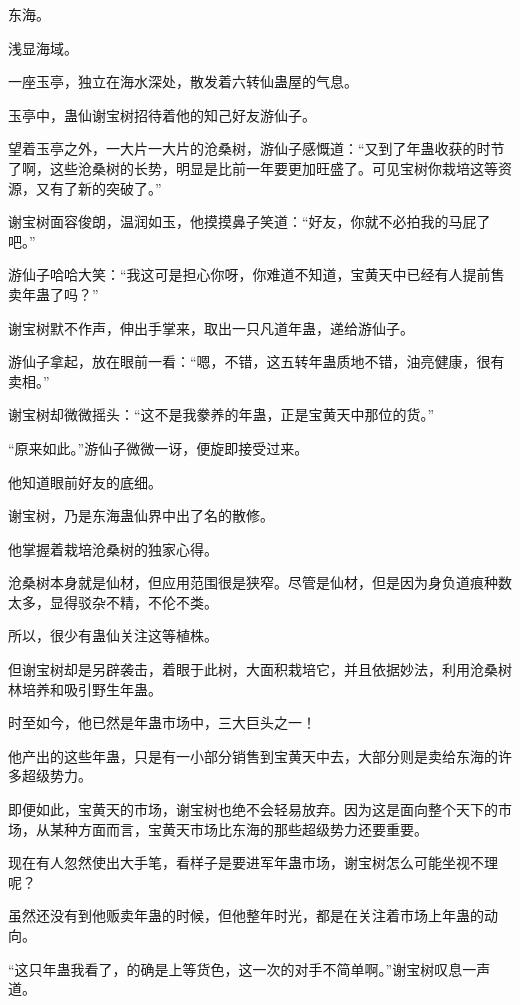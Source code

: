 
\begin{this_body}

东海。

浅显海域。

一座玉亭，独立在海水深处，散发着六转仙蛊屋的气息。

玉亭中，蛊仙谢宝树招待着他的知己好友游仙子。

望着玉亭之外，一大片一大片的沧桑树，游仙子感慨道：“又到了年蛊收获的时节了啊，这些沧桑树的长势，明显是比前一年要更加旺盛了。可见宝树你栽培这等资源，又有了新的突破了。”

谢宝树面容俊朗，温润如玉，他摸摸鼻子笑道：“好友，你就不必拍我的马屁了吧。”

游仙子哈哈大笑：“我这可是担心你呀，你难道不知道，宝黄天中已经有人提前售卖年蛊了吗？”

谢宝树默不作声，伸出手掌来，取出一只凡道年蛊，递给游仙子。

游仙子拿起，放在眼前一看：“嗯，不错，这五转年蛊质地不错，油亮健康，很有卖相。”

谢宝树却微微摇头：“这不是我豢养的年蛊，正是宝黄天中那位的货。”

“原来如此。”游仙子微微一讶，便旋即接受过来。

他知道眼前好友的底细。

谢宝树，乃是东海蛊仙界中出了名的散修。

他掌握着栽培沧桑树的独家心得。

沧桑树本身就是仙材，但应用范围很是狭窄。尽管是仙材，但是因为身负道痕种数太多，显得驳杂不精，不伦不类。

所以，很少有蛊仙关注这等植株。

但谢宝树却是另辟袭击，着眼于此树，大面积栽培它，并且依据妙法，利用沧桑树林培养和吸引野生年蛊。

时至如今，他已然是年蛊市场中，三大巨头之一！

他产出的这些年蛊，只是有一小部分销售到宝黄天中去，大部分则是卖给东海的许多超级势力。

即便如此，宝黄天的市场，谢宝树也绝不会轻易放弃。因为这是面向整个天下的市场，从某种方面而言，宝黄天市场比东海的那些超级势力还要重要。

现在有人忽然使出大手笔，看样子是要进军年蛊市场，谢宝树怎么可能坐视不理呢？

虽然还没有到他贩卖年蛊的时候，但他整年时光，都是在关注着市场上年蛊的动向。

“这只年蛊我看了，的确是上等货色，这一次的对手不简单啊。”谢宝树叹息一声道。


\end{this_body}
